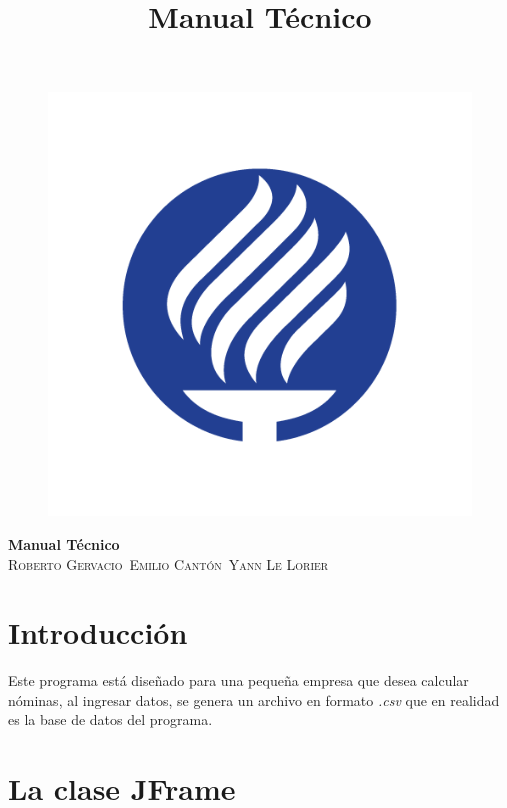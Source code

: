 \documentclass[12pt]{article}
\title{Manual T\'ecnico}
\author{}
\date{}
\begin{document}
\begin{titlepage}
	\begin{center}
		\begin{figure}
			\includegraphics[width=150mm]{Tec.jpg}
			\label{fig:Tec}
		\end{figure}
	\huge{\bfseries{Manual T\'ecnico}}\\
	\textsc{\small{Roberto Gervacio}}\
	\textsc{\small{Emilio Cant\'on}}\
	\textsc{\small{Yann Le Lorier}}\
	\end{center}
\end{titlepage}
\maketitle
\tableofcontents

\section{Introducci\'on}
{Este programa est\'a dise\~nado para una peque\~na empresa que desea calcular n\'ominas, al ingresar datos, se genera un archivo en formato \textit{.csv} que en realidad es la base de datos del programa.}

\section{La clase JFrame}
\end{document}
